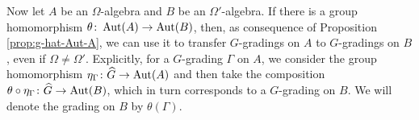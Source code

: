 Now let $A$ be an $\Omega$-algebra and $B$ be an $\Omega'$-algebra.
If there is a group homomorphism $\theta\colon \operatorname{Aut}(A) \to \operatorname{Aut}(B)$, then, as consequence of Proposition \ref{prop:g-hat-Aut-A}, we can use it to transfer $G$-gradings on $A$ to $G$-gradings on $B$, even if $\Omega \neq \Omega'$.
Explicitly, for a $G$-grading $\Gamma$ on $A$, we consider the group homomorphism $\eta_\Gamma\colon \widehat G \to \operatorname{Aut} (A)$ and then take the composition $\theta \circ \eta_\Gamma\colon \widehat G \to \operatorname{Aut}(B)$, which in turn corresponds to a $G$-grading on $B$.
We will denote the grading on $B$ by $\theta(\Gamma)$.



